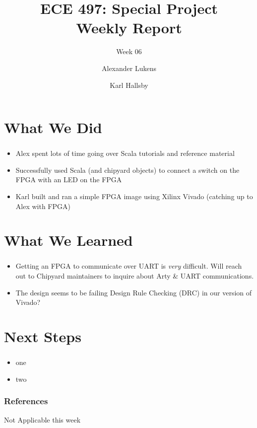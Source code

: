 \documentclass{../weeklyslides}
\title[Weekly Report]{ECE 497: Special Project \\ Weekly Report}
\subtitle{Week 06}
\author{Alexander Lukens \and Karl Hallsby}
\institute{Illinois Institute of Technology}
\date{\DTMdisplaydate{2021}{3}{3}{-1}}
\begin{document}
\nocite{chipyard}

\begin{frame}
  \titlepage{}
\end{frame}

\section{What We Did}\label{sec:What_We_Did}
\begin{frame}
  \frametitle{}
  \begin{itemize}
 	\item Alex spent lots of time going over Scala tutorials and reference material
 	\item Successfully used Scala (and chipyard objects) to connect a switch on the FPGA with an LED on the FPGA
 	\item Karl built and ran a simple FPGA image using Xilinx Vivado (catching up to Alex with FPGA)
  \end{itemize}
  
\end{frame}

\section{What We Learned}\label{sec:What_We_Learned}
\begin{frame}
  \frametitle{}
  \begin{itemize}
  	\item Getting an FPGA to communicate over UART is \emph{very} difficult. Will reach out to Chipyard maintainers to inquire about Arty \& UART communications.
  	\item The design seems to be failing Design Rule Checking (DRC) in our version of Vivado?
  	
  \end{itemize}
  
  \end{frame}

\section{Next Steps}\label{sec:Next_Steps}
\begin{frame}
  \frametitle{}
  	\begin{itemize}
  		\item one
  		\item two

  	\end{itemize}
\end{frame}

\begin{frame}
  \frametitle{References}
  Not Applicable this week
  \printbibliography[heading=bibintoc]{}
\end{frame}
\end{document}
